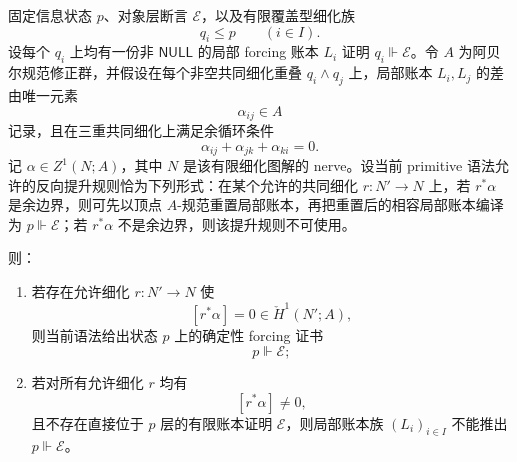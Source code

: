 \begin{proposition}\label{distill:cech_cohomology-local_to_global_certificate_descent-forcing-cech-promotion-criterion}
固定信息状态 \(p\)、对象层断言 \(\mathcal E\)，以及有限覆盖型细化族
\[
q_i\le p\qquad(i\in I).
\]
设每个 \(q_i\) 上均有一份非 \(\mathsf{NULL}\) 的局部 forcing 账本 \(L_i\) 证明 \(q_i\Vdash\mathcal E\)。令 \(A\) 为阿贝尔规范修正群，并假设在每个非空共同细化重叠 \(q_i\wedge q_j\) 上，局部账本 \(L_i,L_j\) 的差由唯一元素
\[
\alpha_{ij}\in A
\]
记录，且在三重共同细化上满足余循环条件
\[
\alpha_{ij}+\alpha_{jk}+\alpha_{ki}=0.
\]
记 \(\alpha\in Z^1(N;A)\)，其中 \(N\) 是该有限细化图解的 nerve。设当前 primitive 语法允许的反向提升规则恰为下列形式：在某个允许的共同细化 \(r:N'\to N\) 上，若 \(r^\ast\alpha\) 是余边界，则可先以顶点 \(A\)-规范重置局部账本，再把重置后的相容局部账本编译为 \(p\Vdash\mathcal E\)；若 \(r^\ast\alpha\) 不是余边界，则该提升规则不可使用。

则：
\begin{enumerate}
  \item 若存在允许细化 \(r:N'\to N\) 使
  \[
  [r^\ast\alpha]=0\in\check H^1(N';A),
  \]
  则当前语法给出状态 \(p\) 上的确定性 forcing 证书
  \[
  p\Vdash\mathcal E;
  \]
  \item 若对所有允许细化 \(r\) 均有
  \[
  [r^\ast\alpha]\ne0,
  \]
  且不存在直接位于 \(p\) 层的有限账本证明 \(\mathcal E\)，则局部账本族 \((L_i)_{i\in I}\) 不能推出 \(p\Vdash\mathcal E\)。
\end{enumerate}
\end{proposition}

